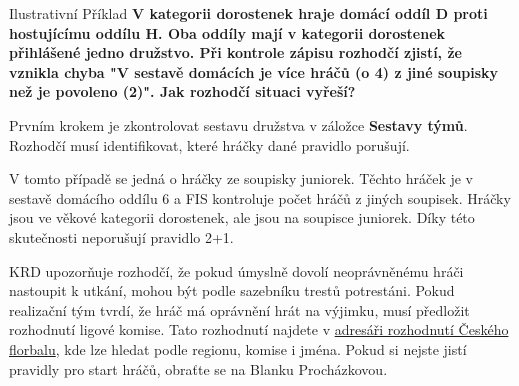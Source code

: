 \documentclass{newsletter}
\begin{document}
\begin{admonition-info}{Ilustrativní Příklad}
	\textbf{V kategorii dorostenek hraje domácí oddíl D proti hostujícímu oddílu H. Oba oddíly mají v kategorii dorostenek přihlášené jedno družstvo. Při kontrole zápisu rozhodčí zjistí, že vznikla chyba "V sestavě domácích je více hráčů (o 4) z jiné soupisky než je povoleno (2)". Jak rozhodčí situaci vyřeší?}
	
	\vspace{\baselineskip}
	Prvním krokem je zkontrolovat sestavu družstva v záložce \textbf{Sestavy týmů}. Rozhodčí musí identifikovat, které hráčky dané pravidlo porušují.
	
	\endgroup
	
	V tomto případě se jedná o hráčky ze soupisky juniorek. Těchto hráček je v sestavě domácího oddílu 6 a FIS kontroluje počet hráčů z jiných soupisek. Hráčky jsou ve věkové kategorii dorostenek, ale jsou na soupisce juniorek. Díky této skutečnosti neporušují pravidlo 2+1.
\end{admonition-info}

KRD upozorňuje rozhodčí, že pokud úmyslně dovolí neoprávněnému hráči nastoupit k utkání, mohou být podle sazebníku trestů potrestáni. Pokud realizační tým tvrdí, že hráč má oprávnění hrát na výjimku, musí předložit rozhodnutí ligové komise. Tato rozhodnutí najdete v \href{https://www.ceskyflorbal.cz/directory/decisions/}{adresáři rozhodnutí Českého florbalu}, kde lze hledat podle regionu, komise i jména. Pokud si nejste jistí pravidly pro start hráčů, obraťte se na Blanku Procházkovou.
\end{document}

